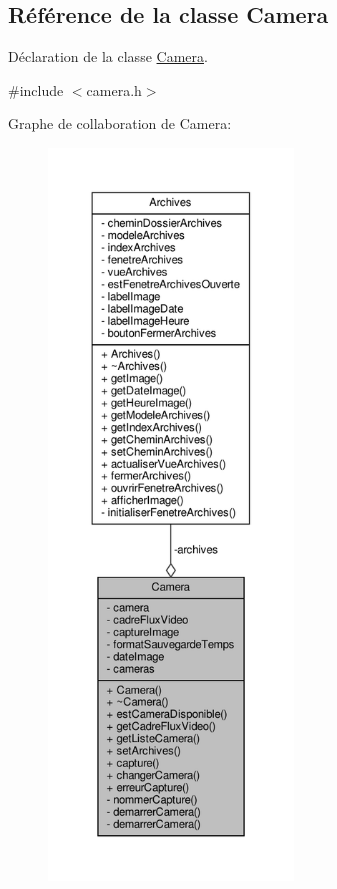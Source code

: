 \hypertarget{class_camera}{}\subsection{Référence de la classe Camera}
\label{class_camera}


Déclaration de la classe \hyperlink{class_camera}{Camera}.  




{\ttfamily \#include $<$camera.\+h$>$}



Graphe de collaboration de Camera\+:
\nopagebreak
\begin{figure}[H]
\begin{center}
\leavevmode
\includegraphics[height=550pt]{class_camera__coll__graph}
\end{center}
\end{figure}
